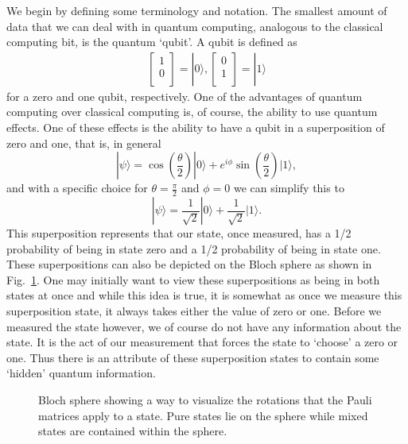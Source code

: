 \documentclass[aps,pra,twocolumn,amsmath,amssymb,nofootinbib,superscriptaddress]{revtex4}
\newcommand{\ket}[1]{|#1\rangle}
\begin{document}
 We begin by defining some terminology and notation. The smallest amount of data that we can deal with in quantum computing, analogous to the classical computing bit, is the quantum `qubit'. A qubit is defined as 
\begin{eqnarray}
 \left[ \begin{array}{l}
1 \\
0 \\
\end{array} \right] = \ket{0},
\left[ \begin{array}{l}
0 \\
1 \\
\end{array} \right] = \ket{1}
\end{eqnarray}
for a zero and one qubit, respectively. One of the advantages of quantum computing over classical computing is, of course, the ability to use quantum effects. One of these effects is the ability to have a qubit in a superposition of zero and one, that is, in general
\begin{equation}
\ket{\psi} = \cos\left(\frac{\theta}{2}\right) \ket{0} + e^{i \phi} \sin\left(\frac{\theta}{2}\right)\ket{1},
\end{equation}
 and with a specific choice for $\theta =\frac{\pi}{2}$ and $\phi =0$ we can simplify this to
\begin{equation}
\ket{\psi}= \frac{1}{\sqrt{2}} \ket{0} + \frac{1}{\sqrt{2}} \ket{1}.
\end{equation}
This superposition represents that our state, once measured, has a 1/2 probability of being in state zero and a 1/2 probability of being in state one. These superpositions can also be depicted on the Bloch sphere as shown in Fig.~\ref{fig:Bloch}. One may initially want to view these superpositions as being in both states at once and while this idea is true, it is somewhat as once we measure this superposition state, it always takes either the value of zero or one. Before we measured the state however, we of course do not have any information about the state. It is the act of our measurement that forces the state to `choose' a zero or one. Thus there is an attribute of these superposition states to contain some `hidden' quantum information.
\begin{figure}[bt]
 \centering
  \caption{ Bloch sphere showing a way to visualize the rotations that the Pauli matrices apply to a state. Pure states lie on the sphere while mixed states are contained within the sphere.}
  \label{fig:Bloch}
\end{figure}
\end{document}
